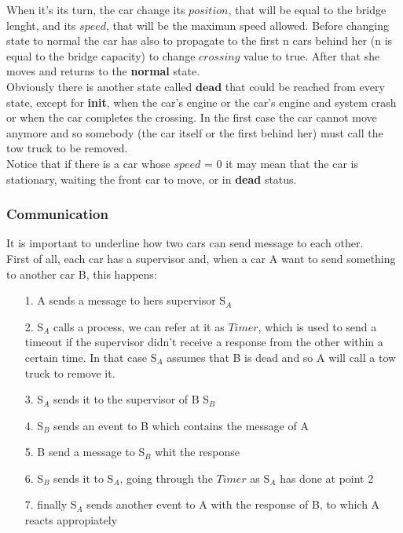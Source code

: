 When it's its turn, the car change its $position$, that will be equal to the bridge lenght, and its $speed$,
that will be the maximun speed allowed. Before changing state to normal the car has also to propagate to the first n cars behind her (n is equal to the bridge capacity) 
to change $crossing$ value to true. After that she moves and returns to the \textbf{normal} state.\\
Obviously there is another state called $\textbf{dead}$ that could be reached from every state, except for \textbf{init}, 
when the car's engine or the car's engine and system crash or when the car completes the crossing. 
In the first case the car cannot move anymore and so somebody (the car itself or the first behind her) must call the tow truck to be removed. 
\\Notice that if there is a car whose $speed$ = 0 it may mean that the car is stationary, waiting the front
 car to move, or in \textbf{dead} status.\\

\subsubsection{Communication}

It is important to underline how two cars can send message to each other. \\
First of all, each car has a supervisor and, when a car A want to send something to another car B,
this happens:
\begin{itemize}
   \item[1.] A sends a message to hers supervisor S$_{A}$
   \item [2.] S$_{A}$ calls a process, we can refer at it as $Timer$, which is used to send a timeout
   if the supervisor didn't receive a response from the other within a certain time. In that case S$_{A}$ assumes 
   that B is dead and so A will call a tow truck to remove it.
   \item[3.] S$_{A}$ sends it to the supervisor of B S$_{B}$
   \item [4.] S$_{B}$ sends an event to B which contains the message of A
   \item [5.] B send a message to S$_{B}$ whit the response
   \item [6.] S$_{B}$ sends it to S$_{A}$, going through the $Timer$ as S$_{A}$ has done at point 2
   \item [7.] finally S$_{A}$ sends another event to A with the response of B, to which A reacts appropiately
\end{itemize}

